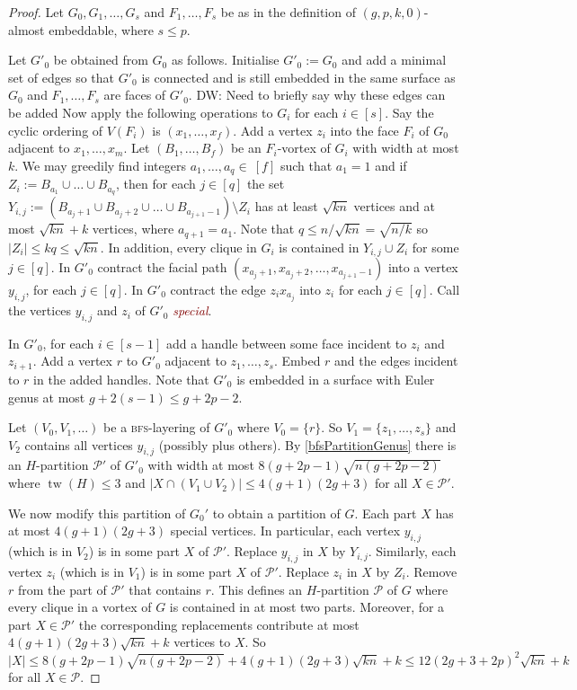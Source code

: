 \documentclass[12pt]{article}
\newcommand{\defn}[1]{\textcolor{Maroon}{\emph{#1}}}
\renewcommand{\leq}{\leqslant}
\DeclareMathOperator{\tw}{tw}
\newcommand{\PP}{\mathcal{P}}
\newcommand{\david}[1]{{\color{blue} DW: #1}}
\theoremstyle{plain}
\theoremstyle{definition}
\begin{document}
\begin{proof}
    Let $G_0,G_1,\dots,G_s$ and $F_1,\dots,F_s$ be as in the definition of $(g,p,k,0)$-almost embeddable, where $s\leq p$. 
	
    Let $G'_0$ be obtained from $G_0$ as follows. Initialise $G'_0:=G_0$ and add a minimal set of edges so that $G'_0$ is connected and is still embedded in the same surface as $G_0$
    and $F_1,\dots,F_s$ are faces of $G'_0$. \david{Need to briefly say why these edges can be added} Now apply the following operations to $G_i$ for each $i\in[s]$. Say the cyclic ordering of $V(F_i)$ is $(x_1,\dots,x_f)$. Add a vertex $z_i$ into the face $F_i$ of $G_0$ adjacent to $x_1,\dots,x_m$. Let $(B_1,\dots,B_f)$ be an $F_i$-vortex of $G_i$ with width at most $k$. We may greedily find integers $a_1,\dots,a_q\in\ [f]$  such that $a_1=1$ and if $Z_i:=B_{a_1}\cup\dots\cup B_{a_q}$, then for each $j\in [q]$ the set $Y_{i,j}:=(B_{a_j+1}\cup B_{a_j+2}\cup\dots\cup B_{a_{j+1}-1})\setminus Z_i$ has at least $\sqrt{kn}$ vertices and at most $\sqrt{kn}+k$ vertices, where $a_{q+1}=a_1$. Note that $q \leq n/ \sqrt{kn}=\sqrt{n/k}$ so $|Z_i|\leq kq\leq\sqrt{kn}$. In addition, every clique in $G_i$ is contained in $Y_{i,j}\cup Z_i$ for some $j\in [q]$. In $G'_0$ contract the facial path $(x_{a_j+1},x_{a_j+2},\dots,x_{a_{j+1}-1})$ into a vertex $y_{i,j}$, for each $j\in [q]$. In $G'_0$ contract the edge $z_ix_{a_j}$ into $z_i$ for each $j\in [q]$. Call the vertices $y_{i,j}$ and $z_i$ of $G'_0$ \defn{special}.
	
    In $G'_0$, for each $i\in [s-1]$ add a handle between some face incident to $z_i$ and $z_{i+1}$. Add a vertex $r$ to $G'_0$ adjacent to $z_1,\dots,z_s$. Embed $r$ and the edges incident to $r$ in the added handles. Note that $G'_0$ is embedded in a surface with Euler genus at most $g+2(s-1) \leq g+2p-2$. 
	
    Let $(V_0,V_1,\dots)$ be a \textsc{bfs}-layering of $G'_0$ where $V_0=\{r\}$. So $V_1=\{z_1,\dots,z_s\}$ and $V_2$ contains all vertices $y_{i,j}$ (possibly plus others). By \cref{bfsPartitionGenus} there is an $H$-partition $\PP'$ of $G'_0$ with width at most $8(g+2p-1){\sqrt{n(g+2p-2)}}$ where $\tw(H)\leq 3$ and $|X\cap (V_1\cup V_2)|\leq 4(g+1)(2g+3)$ for all $X \in \PP'$.
    
    We now modify this partition of $G_0'$ to obtain a partition of $G$. Each part $X$ has at most $4(g+1)(2g+3)$ special vertices. In particular, each vertex $y_{i,j}$ (which is in $V_2$) is in some part $X$ of $\PP'$. Replace $y_{i,j}$ in $X$ by $Y_{i,j}$. Similarly, each vertex $z_{i}$ (which is in $V_1$) is in some part $X$ of $\PP'$. Replace $z_i$ in $X$ by $Z_i$. Remove $r$ from the part of $\PP'$ that contains $r$. This defines an $H$-partition $\PP$ of $G$ where every clique in a vortex of $G$ is contained in at most two parts. Moreover, for a part $X\in \PP'$ the corresponding replacements contribute at most $4(g+1)(2g+3)\sqrt{kn}+k$ vertices to $X$. So $|X|\leq 8(g+2p-1){\sqrt{n(g+2p-2)}}+4(g+1)(2g+3)\sqrt{kn}+k\leq 12(2g+3+2p)^2\sqrt{kn}+k $ for all $X \in \PP$.
\end{proof}
\end{document}
